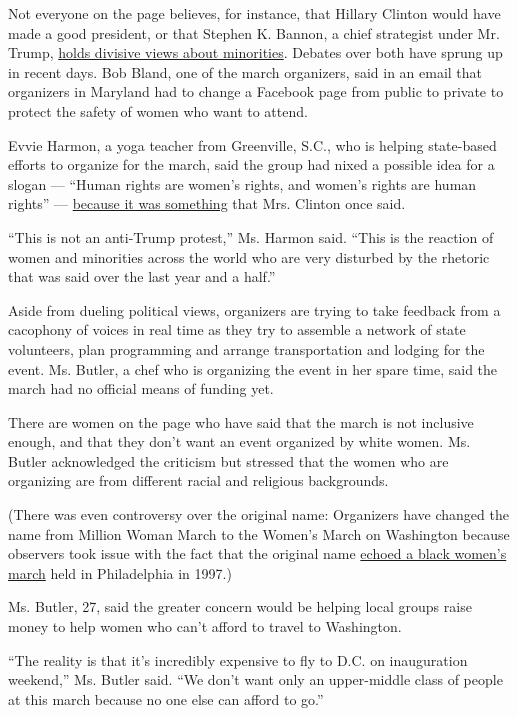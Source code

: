 Not everyone on the page believes, for instance, that Hillary Clinton
would have made a good president, or that Stephen K. Bannon, a chief
strategist under Mr. Trump,
\href{http://www.nytimes3xbfgragh.onion/2016/11/15/us/politics/stephen-bannon-white-house-trump.html}{holds
divisive views about minorities}. Debates over both have sprung up in
recent days. Bob Bland, one of the march organizers, said in an email
that organizers in Maryland had to change a Facebook page from public to
private to protect the safety of women who want to attend.

Evvie Harmon, a yoga teacher from Greenville, S.C., who is helping
state-based efforts to organize for the march, said the group had nixed
a possible idea for a slogan --- ``Human rights are women's rights, and
women's rights are human rights'' ---
\href{http://www.nytimes3xbfgragh.onion/politics/first-draft/2015/09/05/20-years-later-hillary-clintons-beijing-speech-on-women-resonates/}{because
it was something} that Mrs. Clinton once said.

``This is not an anti-Trump protest,'' Ms. Harmon said. ``This is the
reaction of women and minorities across the world who are very disturbed
by the rhetoric that was said over the last year and a half.''

Aside from dueling political views, organizers are trying to take
feedback from a cacophony of voices in real time as they try to assemble
a network of state volunteers, plan programming and arrange
transportation and lodging for the event. Ms. Butler, a chef who is
organizing the event in her spare time, said the march had no official
means of funding yet.

There are women on the page who have said that the march is not
inclusive enough, and that they don't want an event organized by white
women. Ms. Butler acknowledged the criticism but stressed that the women
who are organizing are from different racial and religious backgrounds.

(There was even controversy over the original name: Organizers have
changed the name from Million Woman March to the Women's March on
Washington because observers took issue with the fact that the original
name \href{http://www.blackpast.org/aah/million-woman-march-1997}{echoed
a black women's march} held in Philadelphia in 1997.)

Ms. Butler, 27, said the greater concern would be helping local groups
raise money to help women who can't afford to travel to Washington.

``The reality is that it's incredibly expensive to fly to D.C. on
inauguration weekend,'' Ms. Butler said. ``We don't want only an
upper-middle class of people at this march because no one else can
afford to go.''

